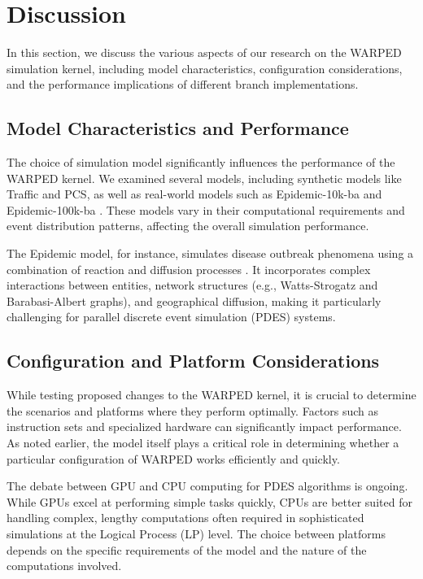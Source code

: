\section{Discussion}

In this section, we discuss the various aspects of our research on the WARPED simulation kernel, including model characteristics, configuration considerations, and the performance implications of different branch implementations.

\subsection{Model Characteristics and Performance}

The choice of simulation model significantly influences the performance of the WARPED kernel. We examined several models, including synthetic models like Traffic and PCS, as well as real-world models such as Epidemic-10k-ba and Epidemic-100k-ba \cite{perumalla2012discrete}. These models vary in their computational requirements and event distribution patterns, affecting the overall simulation performance.

The Epidemic model, for instance, simulates disease outbreak phenomena using a combination of reaction and diffusion processes \cite{barrett2008episimdemics}. It incorporates complex interactions between entities, network structures (e.g., Watts-Strogatz \cite{watts1998collective} and Barabasi-Albert \cite{barabasi1999emergence} graphs), and geographical diffusion, making it particularly challenging for parallel discrete event simulation (PDES) systems.

\subsection{Configuration and Platform Considerations}

While testing proposed changes to the WARPED kernel, it is crucial to determine the scenarios and platforms where they perform optimally. Factors such as instruction sets and specialized hardware can significantly impact performance. As noted earlier, the model itself plays a critical role in determining whether a particular configuration of WARPED works efficiently and quickly.

The debate between GPU and CPU computing for PDES algorithms is ongoing. While GPUs excel at performing simple tasks quickly, CPUs are better suited for handling complex, lengthy computations often required in sophisticated simulations at the Logical Process (LP) level. The choice between platforms depends on the specific requirements of the model and the nature of the computations involved.

